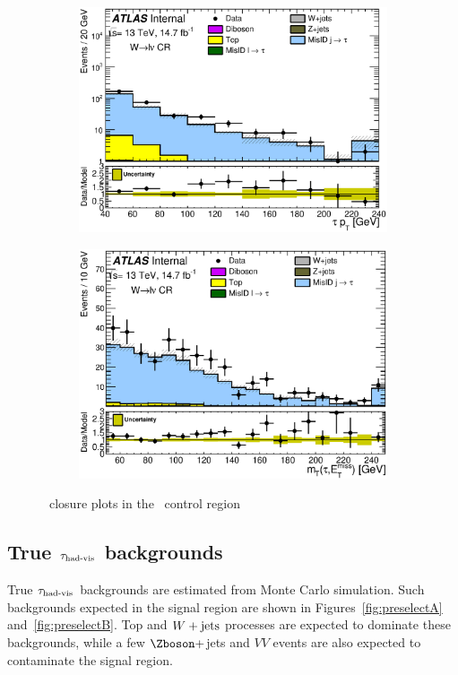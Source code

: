 \begin{figure}[!h]
\begin{subfigure}{0.5\textwidth}
   \includegraphics[width=\textwidth]{figures/DDQCD15_FFttll_taupt_log.eps}
\caption{}
\end{subfigure} %
\begin{subfigure}{0.5\textwidth}
   \includegraphics[width=\textwidth]{figures/DDQCD15_FFttll_MT.eps}
\caption{}
\end{subfigure}
\caption{\FF\ closure plots in the \ttbar\ control region}
\label{fig:clTTBar}
\end{figure}


\subsection{True $\tau_{\text{had-vis}}$ backgrounds}
\label{sec:truetau}
\par True $\tau_{\text{had-vis}}$ backgrounds are estimated from Monte Carlo simulation. 
Such backgrounds expected in the signal region are shown in Figures~\ref{fig:preselectA} and~\ref{fig:preselectB}.
Top and $W+\text{jets}$ processes are expected to dominate these backgrounds, while a few $\Zboson+$jets and $VV$ 
events are also expected to contaminate the signal region.

